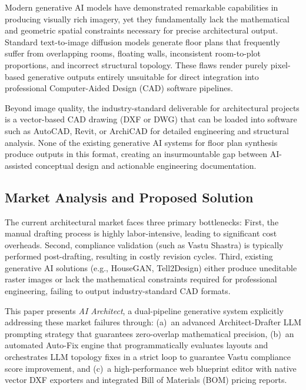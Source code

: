 \documentclass[10pt, twocolumn, letterpaper]{article}
\begin{document}
Modern generative AI models have demonstrated remarkable capabilities in
producing visually rich imagery, yet they fundamentally lack the mathematical
and geometric spatial constraints necessary for precise architectural output.
Standard text-to-image diffusion models generate floor plans that frequently
suffer from overlapping rooms, floating walls, inconsistent room-to-plot
proportions, and incorrect structural topology. These flaws render purely
pixel-based generative outputs entirely unsuitable for direct integration into
professional Computer-Aided Design (CAD) software pipelines.

Beyond image quality, the industry-standard deliverable for architectural
projects is a vector-based CAD drawing (DXF or DWG) that can be loaded into
software such as AutoCAD, Revit, or ArchiCAD for detailed engineering and
structural analysis. None of the existing generative AI systems for floor
plan synthesis produce outputs in this format, creating an insurmountable gap
between AI-assisted conceptual design and actionable engineering documentation.

\subsection{Market Analysis and Proposed Solution}
The current architectural market faces three primary bottlenecks: First, the manual drafting process is highly labor-intensive, leading to significant cost overheads. Second, compliance validation (such as Vastu Shastra) is typically performed post-drafting, resulting in costly revision cycles. Third, existing generative AI solutions (e.g., HouseGAN, Tell2Design) either produce uneditable raster images or lack the mathematical constraints required for professional engineering, failing to output industry-standard CAD formats.

This paper presents \textit{AI Architect}, a dual-pipeline generative system explicitly addressing these market failures through: (a)~an advanced Architect-Drafter LLM prompting strategy that guarantees zero-overlap mathematical precision, (b)~an automated Auto-Fix engine that programmatically evaluates layouts and orchestrates LLM topology fixes in a strict loop to guarantee Vastu compliance score improvement, and (c)~a high-performance web blueprint editor with native vector DXF exporters and integrated Bill of Materials (BOM) pricing reports.
\end{document}
